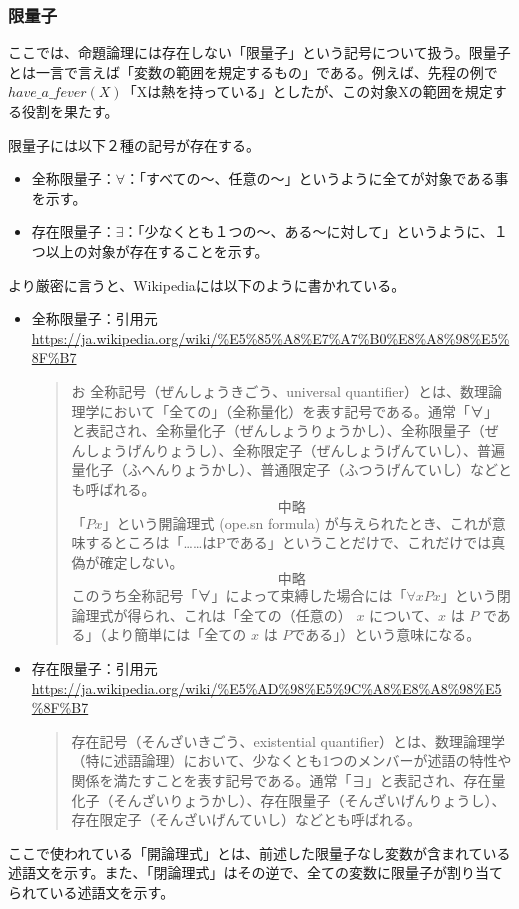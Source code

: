 \documentclass[dvipdfmx]{jsarticle}
\begin{document}
  \subsubsection{限量子}
ここでは、命題論理には存在しない「限量子」という記号について扱う。限量子とは一言で言えば「変数の範囲を規定するもの」である。例えば、先程の例で$have\_a\_fever(X)$「Xは熱を持っている」としたが、この対象Xの範囲を規定する役割を果たす。\par
限量子には以下２種の記号が存在する。
\begin{itemize}
  \item 全称限量子：$\forall$：「すべての〜、任意の〜」というように全てが対象である事を示す。
  \item 存在限量子：$\exists$：「少なくとも１つの〜、ある〜に対して」というように、１つ以上の対象が存在することを示す。
\end{itemize}
より厳密に言うと、Wikipediaには以下のように書かれている。
\begin{itemize}
  \item 全称限量子：引用元\url{https://ja.wikipedia.org/wiki/%E5%85%A8%E7%A7%B0%E8%A8%98%E5%8F%B7}
  \begin{quote}お
    全称記号（ぜんしょうきごう、universal quantifier）とは、数理論理学において「全ての」（全称量化）を表す記号である。通常「∀」と表記され、全称量化子（ぜんしょうりょうかし）、全称限量子（ぜんしょうげんりょうし）、全称限定子（ぜんしょうげんていし）、普遍量化子（ふへんりょうかし）、普通限定子（ふつうげんていし）などとも呼ばれる。
    \[中略\]
    「$Px$」という開論理式 (ope.sn formula) が与えられたとき、これが意味するところは「……はPである」ということだけで、これだけでは真偽が確定しない。\[中略\]
    このうち全称記号「∀」によって束縛した場合には「$\forall x Px$」という閉論理式が得られ、これは「全ての（任意の） $x$ について、$x$ は $P$ である」（より簡単には「全ての $x$ は $P$である」）という意味になる。
  \end{quote}
  \item 存在限量子：引用元\url{https://ja.wikipedia.org/wiki/%E5%AD%98%E5%9C%A8%E8%A8%98%E5%8F%B7}
  \begin{quote}
    存在記号（そんざいきごう、existential quantifier）とは、数理論理学（特に述語論理）において、少なくとも1つのメンバーが述語の特性や関係を満たすことを表す記号である。通常「∃」と表記され、存在量化子（そんざいりょうかし）、存在限量子（そんざいげんりょうし）、存在限定子（そんざいげんていし）などとも呼ばれる。
  \end{quote}
\end{itemize}
ここで使われている「開論理式」とは、前述した限量子なし変数が含まれている述語文を示す。また、「閉論理式」はその逆で、全ての変数に限量子が割り当てられている述語文を示す。
\end{document}
